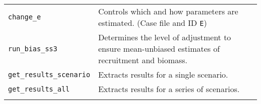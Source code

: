 \documentclass[11pt]{article}
\begin{document}
\begin{longtable}[c]{@{}ll@{}}
\begin{minipage}[t]{0.32\columnwidth}\raggedright
\texttt{change\_e}
\end{minipage} & \begin{minipage}[t]{0.57\columnwidth}\raggedright
Controls which and how parameters are estimated. (Case file and ID \texttt{E})
\end{minipage}
\\\noalign{\medskip}
\begin{minipage}[t]{0.32\columnwidth}\raggedright
\texttt{run\_bias\_ss3}
\end{minipage} & \begin{minipage}[t]{0.57\columnwidth}\raggedright
Determines the level of adjustment to ensure mean-unbiased estimates of recruitment and biomass.
\end{minipage}
\\\noalign{\medskip}
\begin{minipage}[t]{0.32\columnwidth}\raggedright
\texttt{get\_results\_scenario}
\end{minipage} & \begin{minipage}[t]{0.57\columnwidth}\raggedright
Extracts results for a single scenario.
\end{minipage}
\\\noalign{\medskip}
\begin{minipage}[t]{0.32\columnwidth}\raggedright
\texttt{get\_results\_all}
\end{minipage} & \begin{minipage}[t]{0.57\columnwidth}\raggedright
Extracts results for a series of scenarios.
\end{minipage}
\\\noalign{\medskip}
\hline
\end{longtable}



\end{document}
